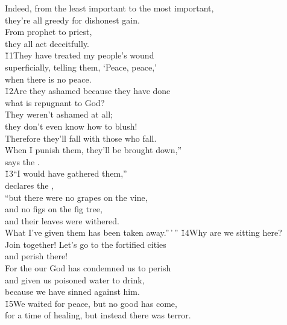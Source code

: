 \begin{poetry}
\poeml Indeed, from the least important to the most important, \\
\poemll    they're all greedy for dishonest gain. \\
\poeml From prophet to priest, \\
\poemll    they all act deceitfully. \\
\poeml \v{11}They have treated my people's wound \\
\poemll    superficially, telling them, `Peace, peace,' \\
\poemlll       when there is no peace. \\
\poeml \v{12}Are they ashamed because they have done \\
\poemll    what is repugnant to God? \\
\poeml They weren't ashamed at all; \\
\poemll    they don't even know how to blush! \\
\poeml Therefore they'll fall with those who fall. \\
\poemll    When I punish them, they'll be brought down,'' \\
\poemlll       says the . \\
\poeml \v{13}``I would have gathered them,'' \\
\poemll    declares the , \\
\poeml ``but there were no grapes on the vine, \\
\poemll    and no figs on the fig tree, \\
\poeml and their leaves were withered. \\
\poemll    What I've given them has been taken away.''\,'\,''
\poeml \v{14}Why are we sitting here? \\
\poemll    Join together! Let's go to the fortified cities \\
\poemlll       and perish there! \\
\poeml For the  our God has condemned us to perish \\
\poemll    and given us poisoned water to drink, \\
\poemlll       because we have sinned against him. \\
\poeml \v{15}We waited for peace, but no good has come, \\
\poemll    for a time of healing, but instead there was terror.

\end{poetry}
